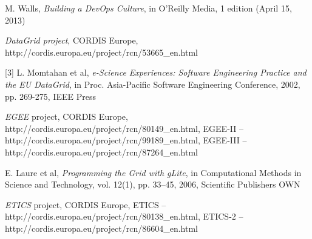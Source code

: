 \documentclass[journal]{IEEEtran}
\begin{document}
\begin{thebibliography}{1}

M. Walls, \emph{Building a DevOps Culture}, in O'Reilly Media, 1 edition (April 15, 2013)

\emph{DataGrid project}, CORDIS Europe, http://cordis.europa.eu/project/rcn/53665\_en.html

[3] L. Momtahan et al, \emph{e-Science Experiences: Software Engineering Practice and the EU DataGrid}, in Proc. Asia-Pacific Software Engineering Conference, 2002, pp. 269-275, IEEE Press

\emph{EGEE} project, CORDIS Europe, http://cordis.europa.eu/project/rcn/80149\_en.html, EGEE-II -- http://cordis.europa.eu/project/rcn/99189\_en.html, EGEE-III -- http://cordis.europa.eu/project/rcn/87264\_en.html
%
%
%

E. Laure et al, \emph{Programming the Grid with gLite}, in Computational Methods in Science and Technology, vol. 12(1), pp. 33–45, 2006, Scientific Publishers OWN

\emph{ETICS} project, CORDIS Europe, ETICS -- http://cordis.europa.eu/project/rcn/80138\_en.html, ETICS-2 -- http://cordis.europa.eu/project/rcn/86604\_en.html
%



\end{thebibliography}
\end{document}
